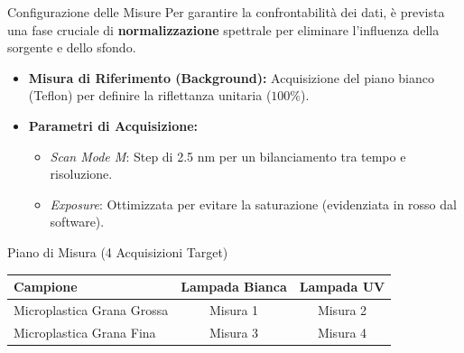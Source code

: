 \documentclass[aspectratio=169]{beamer}
\begin{document}
\begin{frame}{Configurazione delle Misure}
    Per garantire la confrontabilità dei dati, è prevista una fase cruciale di \textbf{normalizzazione} spettrale per eliminare l'influenza della sorgente e dello sfondo.
    
    \vfill
    \begin{itemize}
        \item \textbf{Misura di Riferimento (Background):} Acquisizione del piano bianco (Teflon) per definire la riflettanza unitaria ($100\%$).
        \item \textbf{Parametri di Acquisizione:}
            \begin{itemize}
                \item \textit{Scan Mode M}: Step di 2.5 nm per un bilanciamento tra tempo e risoluzione.
                \item \textit{Exposure}: Ottimizzata per evitare la saturazione (evidenziata in rosso dal software).
            \end{itemize}
    \end{itemize}

    \begin{block}{Piano di Misura (4 Acquisizioni Target)}
        \centering
        \begin{tabular}{lcc}
            \hline
            \textbf{Campione} & \textbf{Lampada Bianca} & \textbf{Lampada UV} \\
            \hline
            Microplastica Grana Grossa & Misura 1 & Misura 2 \\
            Microplastica Grana Fina & Misura 3 & Misura 4 \\
            \hline
        \end{tabular}
    \end{block}
\end{frame}
\end{document}

